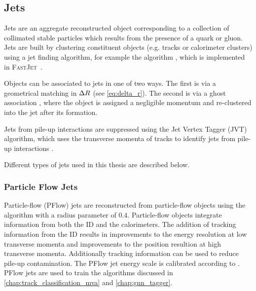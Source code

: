 \subsection{Jets}\label{sec:jet_reco}
Jets are an aggregate reconstructed object corresponding to a collection of collimated stable particles which results from the presence of a quark or gluon.
Jets are built by clustering constituent objects (e.g. tracks or calorimeter clusters) using a jet finding algorithm, for example the \antikt algorithm \cite{Cacciari:2008gp}, which is implemented in \textsc{FastJet}~\cite{Cacciari:2012:fastjet}.

Objects can be associated to jets in one of two ways.
The first is via a geometrical matching in $\Delta R$ (see \cref{eq:delta_r}). 
The second is via a ghost association \cite{Cacciari:2008gn}, where the object is assigned a negligible momentum and re-clustered into the jet after its formation.

Jets from pile-up interactions are suppressed using the Jet Vertex Tagger (JVT) algorithm, which uses the transverse momenta of tracks to identify jets from pile-up interactions \cite{ATLAS-CONF-2014-018}.

Different types of jets used in this thesis are described below.

\subsubsection{Particle Flow Jets}
Particle-flow (PFlow) jets are reconstructed from particle-flow objects \cite{PERF-2015-09} using the \antikt algorithm with a radius parameter of $0.4$.
Particle-flow objects integrate information from both the ID and the calorimeters.
The addition of tracking information from the ID results in improvements to the energy resolution at low transverse momenta and improvements to the position resultion at high transverse momenta.
Additionally tracking information can be used to reduce pile-up contamination.
The PFlow jet energy scale is calibrated according to .
PFlow jets are used to train the algorithms discussed in \cref{chap:track_classification_mva} and \cref{chap:gnn_tagger}.

